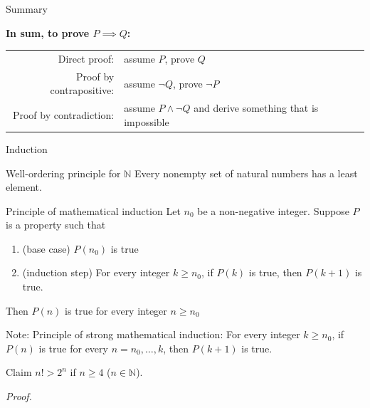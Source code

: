 \documentclass [aspectratio=169]{beamer}
\newcommand{\N}{{\mathbb{N}}}
\begin{document}
\begin{frame}{Summary}

{\bf In sum, to prove $P \implies Q$:} \\

\vspace{1em}


\begin{tabular}{r l}
     Direct proof:  & assume $P$, prove $Q$ \\
     Proof by contrapositive:  & assume $\neg Q$, prove $\neg P$ \\ 
     Proof by contradiction: & assume $P \wedge \neg Q$ and derive something that is impossible \\ 
\end{tabular}

\end{frame}


\begin{frame}{Induction}

\begin{block}{Well-ordering principle for $\mathbb{N}$}
Every nonempty set of natural numbers has a least element.
\end{block}

\begin{block}{Principle of mathematical induction}
Let $n_0$ be a non-negative integer. Suppose $P$ is a property such that 
\begin{enumerate}
\item(base case) $P(n_0)$ is true 
\item (induction step) For every integer $k \geq n_0$, if $P(k)$ is true, then $P(k+1)$ is true.
\end{enumerate}
Then $P(n)$ is true for every integer $n \geq n_0$
\end{block}

Note: Principle of strong mathematical induction: For every integer $k \geq n_0$, if $P(n)$ is true for every $n = n_0, \ldots, k$, then $P(k+1)$ is true.
\end{frame}

\begin{frame}
\begin{exampleblock}{Claim}
$n! > 2^n$ if $n \geq 4$ ($n \in \N$).
\end{exampleblock}


\textit{Proof.}
\vspace{12em}
\end{frame}
\end{document}
